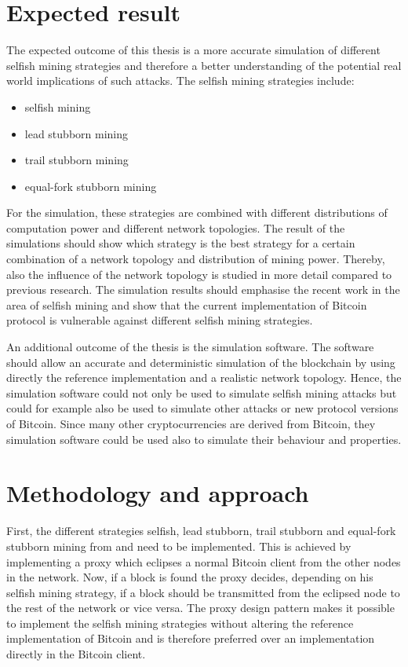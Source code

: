 \documentclass{scrartcl}
\begin{document}
\section{Expected result}
The expected outcome of this thesis is a more accurate simulation of different selfish mining strategies and therefore a better understanding of the potential real world implications of such attacks.
The selfish mining strategies include:
\begin{itemize}
\item selfish mining \cite{eyal2014majority}
\item lead stubborn mining \cite{nayak2016stubborn}
\item trail stubborn mining \cite{nayak2016stubborn}
\item equal-fork stubborn mining \cite{nayak2016stubborn}
\end{itemize}

For the simulation, these strategies are combined with different distributions of computation power and different network topologies.
The result of the simulations should show which strategy is the best strategy for a certain combination of a network topology and distribution of mining power.
Thereby, also the influence of the network topology is studied in more detail compared to previous research. The simulation results should emphasise the recent work in the area of selfish mining and show that the current implementation of Bitcoin protocol is vulnerable against different selfish mining strategies.

An additional outcome of the thesis is the simulation software.
The software should allow an accurate and deterministic simulation of the blockchain by using directly the reference implementation and a realistic network topology.
Hence, the simulation software could not only be used to simulate selfish mining attacks but could for example also be used to simulate other attacks or new protocol versions of Bitcoin. 
Since many other cryptocurrencies are derived from Bitcoin, they simulation software could be used also to simulate their behaviour and properties.

\section{Methodology and approach}
First, the different strategies selfish, lead stubborn, trail stubborn and equal-fork stubborn mining from \citeauthor{nayak2016stubborn} and \citeauthor{eyal2014majority} need to be implemented.
This is achieved by implementing a proxy which eclipses a normal Bitcoin client from the other nodes in the network.
Now, if a block is found the proxy decides, depending on his selfish mining strategy, if a block should be transmitted from the eclipsed node to the rest of the network or vice versa.
The proxy design pattern makes it possible to implement the selfish mining strategies without altering the reference implementation of Bitcoin and is therefore preferred over an implementation directly in the Bitcoin client.
\end{document}
